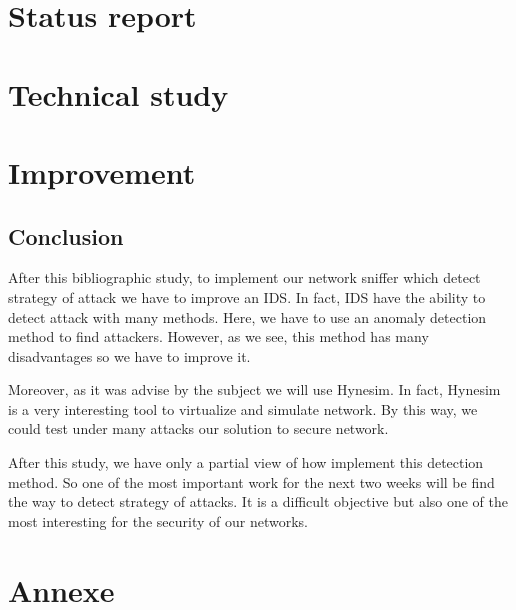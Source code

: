 \documentclass[a4paper, 11pt, oneside, oldfontcommands]{memoir}
\newcounter{th}[chapter]
\begin{document}
\part{Status report}
  
  
  

\part{Technical study}

  
  

\part{Improvement}




\chapter*{Conclusion}


After this bibliographic study, to implement our network sniffer which detect strategy of attack we have to improve
an IDS. In fact, IDS have the ability to detect attack with many methods. Here, we have to use an anomaly detection
method to find attackers. However, as we see, this method has many disadvantages so we have to improve it.

Moreover, as it was advise by the subject we will use Hynesim. In fact, Hynesim is a very interesting tool to
virtualize and simulate network. By this way, we could test under many attacks our solution to secure network.

After this study, we have only a partial view of how implement this detection method. So one of the most important
work for the next two weeks will be find the way to detect strategy of attacks. It is a difficult objective but
also one of the most interesting for the security of our networks.


\newpage


\part*{Annexe}
\appendix
\nocite{*}
%
\newpage
 \listoffigures
 \printindex
 
  
\end{document}
